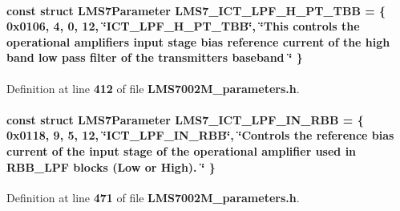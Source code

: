 \paragraph[{L\+M\+S7\+\_\+\+I\+C\+T\+\_\+\+L\+P\+F\+\_\+\+H\+\_\+\+P\+T\+\_\+\+T\+BB}]{\setlength{\rightskip}{0pt plus 5cm}const struct {\bf L\+M\+S7\+Parameter} L\+M\+S7\+\_\+\+I\+C\+T\+\_\+\+L\+P\+F\+\_\+\+H\+\_\+\+P\+T\+\_\+\+T\+BB = \{ 0x0106, 4, 0, 12, \char`\"{}\+I\+C\+T\+\_\+\+L\+P\+F\+\_\+\+H\+\_\+\+P\+T\+\_\+\+T\+B\+B\char`\"{}, \char`\"{}\+This controls the operational amplifiers input stage bias reference current of the high band low pass filter of the transmitter\textquotesingle{}s baseband \char`\"{} \}\hspace{0.3cm}{\ttfamily [static]}}\label{LMS7002M__parameters_8h_a881a13705e1f842f3ac1705fbeebb0c9}


Definition at line {\bf 412} of file {\bf L\+M\+S7002\+M\+\_\+parameters.\+h}.

\paragraph[{L\+M\+S7\+\_\+\+I\+C\+T\+\_\+\+L\+P\+F\+\_\+\+I\+N\+\_\+\+R\+BB}]{\setlength{\rightskip}{0pt plus 5cm}const struct {\bf L\+M\+S7\+Parameter} L\+M\+S7\+\_\+\+I\+C\+T\+\_\+\+L\+P\+F\+\_\+\+I\+N\+\_\+\+R\+BB = \{ 0x0118, 9, 5, 12, \char`\"{}\+I\+C\+T\+\_\+\+L\+P\+F\+\_\+\+I\+N\+\_\+\+R\+B\+B\char`\"{}, \char`\"{}\+Controls the reference bias current of the input stage of the operational amplifier used in R\+B\+B\+\_\+\+L\+P\+F blocks (\+Low or High). \char`\"{} \}\hspace{0.3cm}{\ttfamily [static]}}\label{LMS7002M__parameters_8h_ab52ba6e6dd2710264ab47887c56f60d3}


Definition at line {\bf 471} of file {\bf L\+M\+S7002\+M\+\_\+parameters.\+h}.

